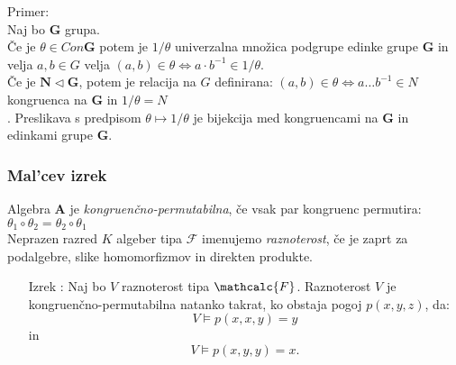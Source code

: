 \documentclass{beamer}
\begin{document}
\begin{frame}
Primer:\\
Naj bo $\mathbf{G}$ grupa. \\
Če je $\theta \in Con \mathbf{G}$ potem je $1/ \theta$ 
univerzalna množica podgrupe edinke grupe $\mathbf{G}$ in velja
$a, b \in G$ velja $\left(a, b\right) \in \theta \Leftrightarrow a \cdot b^{-1} \in 1/\theta$.\\
Če je $\mathbf{N} \vartriangleleft \mathbf{G}$, potem je relacija na $G$ definirana:
$\left(a,b\right) \in \theta \Leftrightarrow a \dots b^{-1} \in N$ kongruenca na $\mathbf{G}$ in $1/\theta= N$\\.
Preslikava s predpisom $\theta \mapsto 1/\theta$ je bijekcija med kongruencami na $\mathbf{G}$ in edinkami grupe $\mathbf{G}$.\\
\end{frame}

\begin{frame}
\frametitle{Mal'cev izrek}
Algebra $\mathbf{A}$ je \emph{kongruenčno-permutabilna}, če vsak par kongruenc permutira: \\
$\theta_1 \circ \theta_2 = \theta_2 \circ \theta_1$\\
Neprazen razred $K$ algeber tipa $\mathcal{F}$ imenujemo \emph{raznoterost}, če je zaprt za podalgebre, 
slike homomorfizmov in direkten produkte.
\begin{enumerate}
\item[Izrek]: Naj bo $V$ raznoterost tipa $\mathcalc{F}$. Raznoterost $V$ je kongruenčno-permutabilna
natanko takrat, ko obstaja pogoj $p\left(x, y, z\right)$, da: \\ $$V \models p\left(x,x,y\right)=y$$ in $$V \models p\left(x,y,y\right)=x.$$
\end{enumerate}
\end{frame}
\end{document}
